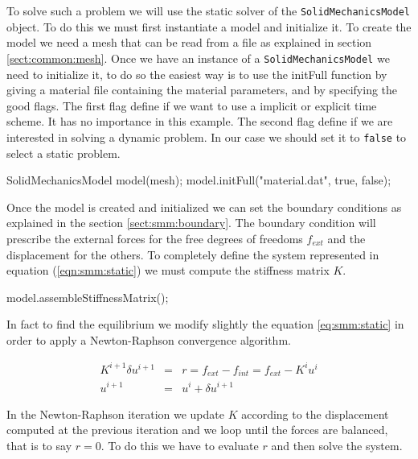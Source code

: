 \documentclass[a4paper,11pt]{book}
\newcommand{\code}[1]{{\tt{#1}}}
\begin{document}
To   solve  such   a   problem  we   will   use  the   static   solver  of   the
\code{SolidMechanicsModel} object. To do this we must
first instantiate a model and initialize it.  To create the model we need a mesh
that    can    be   read    from    a    file    as   explained    in    section
\ref{sect:common:mesh}. Once we have an instance of a \code{SolidMechanicsModel}
we  need  to  initialize   it,  to  do  so  the  easiest  way   is  to  use  the
initFull function by  giving a material file
containing the material parameters, and  by specifying the good flags. The first
flag define  if we want to  use a implicit or  explicit time scheme.   It has no
importance  in this  example. The  second flag  define if  we are  interested in
solving a  dynamic problem.   In our case  we should  set it to  \code{false} to
select a static problem.

\begin{cpp}
  SolidMechanicsModel model(mesh);
  model.initFull("material.dat", true, false);
\end{cpp}

Once the model is created and  initialized we can set the boundary conditions as
explained in  the section  \ref{sect:smm:boundary}. The boundary  condition will
prescribe the external forces for the free degrees of freedoms $f_{ext}$ and the
displacement for  the others.   To completely define  the system  represented in
equation   (\ref{eqn:smm:static})   we    must   compute   the   stiffness   matrix
$K$. 

\begin{cpp}
  model.assembleStiffnessMatrix();
\end{cpp}

In   fact  to   find   the   equilibrium  we   modify   slightly  the   equation
\ref{eq:smm:static} in order to apply a Newton-Raphson convergence algorithm.

\begin{eqnarray}\label{eq:smm:static-newton-raphson}
  K^{i+1} \delta u^{i+1} &=& r = f_{ext} - f_{int} = f_{ext} - K^{i} u^{i}\\
  u^{i+1} &=& u^{i} + \delta u^{i+1}
\end{eqnarray}

In  the Newton-Raphson  iteration we  update $K$  according to  the displacement
computed at  the previous iteration and  we loop until the  forces are balanced,
that is to  say $r = 0$. To do  this we have to evaluate $r$  and then solve the
system.
\end{document}
